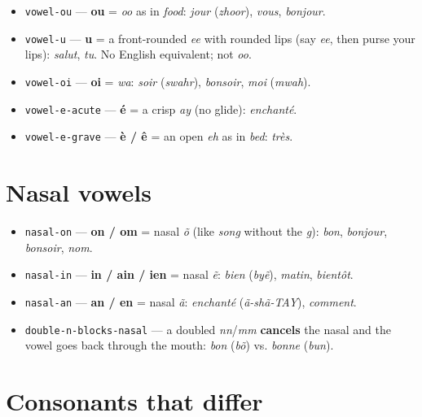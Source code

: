 \begin{itemize}
\raggedright
\setlength{\itemsep}{0.35em}
  \item \texttt{vowel-ou} — \textbf{ou} = \emph{oo} as in \emph{food}: \emph{jour} (\emph{zhoor}), \emph{vous}, \emph{bonjour}.
  \item \texttt{vowel-u} — \textbf{u} = a front-rounded \emph{ee} with rounded lips (say \emph{ee}, then purse your lips): \emph{salut}, \emph{tu}. No English equivalent; not \emph{oo}.
  \item \texttt{vowel-oi} — \textbf{oi} = \emph{wa}: \emph{soir} (\emph{swahr}), \emph{bonsoir}, \emph{moi} (\emph{mwah}).
  \item \texttt{vowel-e-acute} — \textbf{é} = a crisp \emph{ay} (no glide): \emph{enchanté}.
  \item \texttt{vowel-e-grave} — \textbf{è / ê} = an open \emph{eh} as in \emph{bed}: \emph{très}.
\end{itemize}

\section*{Nasal vowels}

\begin{itemize}
\raggedright
\setlength{\itemsep}{0.35em}
  \item \texttt{nasal-on} — \textbf{on / om} = nasal \emph{õ} (like \emph{song} without the \emph{g}): \emph{bon}, \emph{bonjour}, \emph{bonsoir}, \emph{nom}.
  \item \texttt{nasal-in} — \textbf{in / ain / ien} = nasal \emph{ẽ}: \emph{bien} (\emph{byẽ}), \emph{matin}, \emph{bientôt}.
  \item \texttt{nasal-an} — \textbf{an / en} = nasal \emph{ã}: \emph{enchanté} (\emph{ã-shã-TAY}), \emph{comment}.
  \item \texttt{double-n-blocks-nasal} — a doubled \emph{nn}/\emph{mm} \textbf{cancels} the nasal and the vowel goes back through the mouth: \emph{bon} (\emph{bõ}) vs. \emph{bonne} (\emph{bun}).
\end{itemize}

\section*{Consonants that differ}


